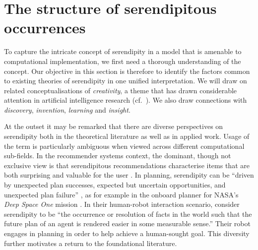 \section{The structure of serendipitous occurrences}
\label{sec:literature-review}

To capture the intricate concept of serendipity in a model that is amenable to computational implementation, we first need a thorough understanding of the concept.  Our objective in this section is therefore to identify the factors common to existing theories of serendipity in one unified interpretation.  We will draw on related conceptualisations of \emph{creativity}, a theme that has drawn considerable attention in artificial intelligence research (cf.~\cite{boden1998creativity,colton2009computational,mccormack2012computers}).  We also draw connections with \emph{discovery}, \emph{invention}, \emph{learning} and \emph{insight}.

At the outset it may be remarked that there are diverse perspectives on serendipity both in the theoretical literature as well as in applied work.  Usage of the term is particularly ambiguous when viewed across different computational sub-fields.  In the recommender systems context, the dominant, though not exclusive view is that serendipitous recommendations characterise items that are both surprising and valuable for the user \cite{Lu2012,Herlocker2004}.  In planning, serendipity can be ``driven by unexpected plan successes, expected but uncertain opportunities, and unexpected plan failure'' \cite{NelsonSerendipitySymp17}, as for example in the onboard planner for NASA's \emph{Deep Space One} mission \cite{muscettola1997board}. In their human-robot interaction scenario, \citet{chakraborti2015planning} consider serendipity to be ``the occurrence or resolution of facts in the world such that the future plan of an agent is rendered easier in some measurable sense.''  Their robot engages in planning in order to help achieve a human-sought goal.
This diversity further motivates a return to the foundational literature.

